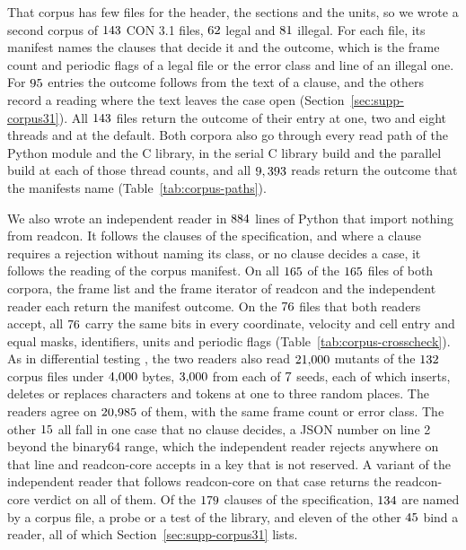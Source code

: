 \documentclass[preprint,12pt]{elsarticle}
\begin{document}
That corpus has few files for the header, the sections and the units, so we wrote a second corpus of \(143\) CON 3.1 files, \(62\) legal and \(81\) illegal.
For each file, its manifest names the clauses that decide it and the outcome, which is the frame count and periodic flags of a legal file or the error class and line of an illegal one.
For \(95\) entries the outcome follows from the text of a clause, and the others record a reading where the text leaves the case open (Section~\ref*{sec:supp-corpus31}).
All \(143\) files return the outcome of their entry at one, two and eight threads and at the default.
Both corpora also go through every read path of the Python module and the C library, in the serial C library build and the parallel build at each of those thread counts, and all \(9,393\) reads return the outcome that the manifests name (Table~\ref*{tab:corpus-paths}).

We also wrote an independent reader in \(884\) lines of Python that import nothing from readcon.
It follows the clauses of the specification, and where a clause requires a rejection without naming its class, or no clause decides a case, it follows the reading of the corpus manifest.
On all \(165\) of the \(165\) files of both corpora, the frame list and the frame iterator of readcon and the independent reader each return the manifest outcome.
On the \(76\) files that both readers accept, all \(76\) carry the same bits in every coordinate, velocity and cell entry and equal masks, identifiers, units and periodic flags (Table~\ref*{tab:corpus-crosscheck}).
As in differential testing \cite{mckeemanDifferentialTestingSoftware1998}, the two readers also read \(21{,}000\) mutants of the \(132\) corpus files under \(4{,}000\) bytes, \(3{,}000\) from each of \(7\) seeds, each of which inserts, deletes or replaces characters and tokens at one to three random places.
The readers agree on \(20{,}985\) of them, with the same frame count or error class.
The other \(15\) all fall in one case that no clause decides, a JSON number on line 2 beyond the binary64 range, which the independent reader rejects anywhere on that line and readcon-core accepts in a key that is not reserved.
A variant of the independent reader that follows readcon-core on that case returns the readcon-core verdict on all of them.
Of the \(179\) clauses of the specification, \(134\) are named by a corpus file, a probe or a test of the library, and eleven of the other \(45\) bind a reader, all of which Section~\ref*{sec:supp-corpus31} lists.
\end{document}
